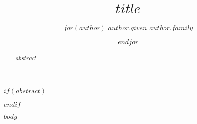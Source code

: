\documentclass[12pt]{article}
\title{$title$}
\author{
    $for(author)$
    $author.given$ $author.family$ \and
    $endfor$
}
\begin{document}
\maketitle

\clearpage
\doublespacing

$if(abstract)$
\begin{abstract}
$abstract$
\end{abstract}
$endif$

\clearpage
\doublespacing

$body$
\end{document}
